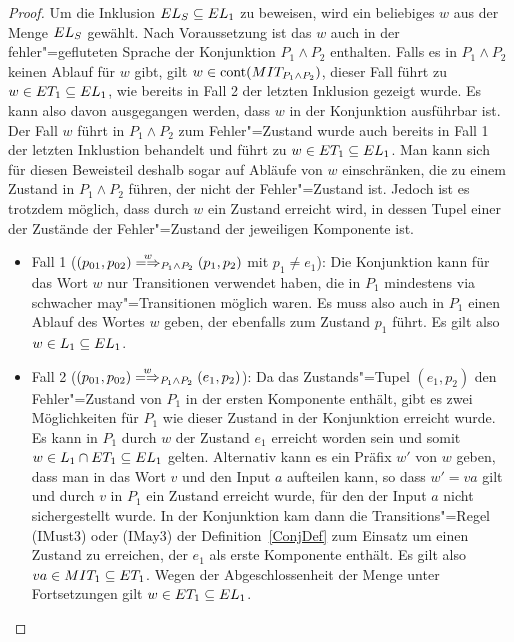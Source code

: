 \begin{proof}
  Um die Inklusion $EL _S\subseteq EL _1$ zu beweisen, wird ein beliebiges $w$
  aus der Menge $EL _S$ gewählt. Nach Voraussetzung ist das $w$ auch in der
  fehler"=gefluteten Sprache der Konjunktion $P_1\land P_2$ enthalten. Falls
  es in $P_1\land P_2$ keinen Ablauf für $w$ gibt, gilt $w\in\mathrm{cont} (MIT
  _{P_1\land P_2})$, dieser Fall führt zu $w\in ET _1\subseteq EL _1$, wie
  bereits in Fall 2 der letzten Inklusion gezeigt wurde. Es kann also davon
  ausgegangen werden, dass $w$ in der Konjunktion ausführbar ist. Der Fall $w$
  führt in $P_1\land P_2$ zum Fehler"=Zustand wurde auch bereits in Fall 1 der
  letzten Inklustion behandelt und führt zu $w\in ET _1\subseteq EL _1$. Man
  kann sich für diesen Beweisteil deshalb sogar auf Abläufe von $w$
  einschränken, die zu einem Zustand in $P_1\land P_2$ führen, der nicht der
  Fehler"=Zustand ist. Jedoch ist es trotzdem möglich, dass durch $w$ ein
  Zustand erreicht wird, in dessen Tupel einer der Zustände der Fehler"=Zustand
  der jeweiligen Komponente ist.
  \begin{itemize}
    \item Fall 1 ($(p_{01},p_{02})\weakmay[w]_{P_1\land P_2} (p_1,p_2)$ mit
      $p_1\neq e_1$): Die Konjunktion kann für das Wort $w$ nur Transitionen
      verwendet haben, die in $P_1$ mindestens via schwacher may"=Transitionen
      möglich waren. Es muss also auch in $P_1$ einen Ablauf des Wortes $w$
      geben, der ebenfalls zum Zustand $p_1$ führt. Es gilt also $w\in L_1
      \subseteq EL _1$.
    \item Fall 2 ($(p_{01},p_{02})\weakmay[w]_{P_1\land P_2} (e_1,p_2)$): Da
      das Zustands"=Tupel $(e_1,p_2)$ den Fehler"=Zustand von $P_1$ in der
      ersten Komponente enthält, gibt es zwei Möglichkeiten für $P_1$ wie
      dieser Zustand in der Konjunktion erreicht wurde. Es kann in $P_1$ durch
      $w$ der Zustand $e_1$ erreicht worden sein und somit $w\in L_1\cap ET
      _1\subseteq EL _1$ gelten. Alternativ kann es ein Präfix $w'$ von $w$
      geben, dass man in das Wort $v$ und den Input $a$ aufteilen kann, so dass
      $w'=va$ gilt und durch $v$ in $P_1$ ein Zustand erreicht wurde, für den
      der Input $a$ nicht sichergestellt wurde. In der Konjunktion kam dann die
      Transitions"=Regel (IMust3) oder (IMay3) der Definition~\ref{ConjDef} zum
      Einsatz um einen Zustand zu erreichen, der $e_1$ als erste Komponente
      enthält. Es gilt also $va\in MIT _1\subseteq ET _1$. Wegen der
      Abgeschlossenheit der Menge \ET{} unter Fortsetzungen gilt $w\in ET _1
      \subseteq EL _1$.
  \end{itemize}
\end{proof}
